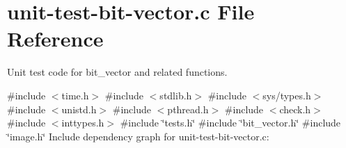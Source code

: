 \hypertarget{unit-test-bit-vector_8c}{}\section{unit-\/test-\/bit-\/vector.c File Reference}
\label{unit-test-bit-vector_8c}


Unit test code for bit\+\_\+vector and related functions.  


{\ttfamily \#include $<$time.\+h$>$}\newline
{\ttfamily \#include $<$stdlib.\+h$>$}\newline
{\ttfamily \#include $<$sys/types.\+h$>$}\newline
{\ttfamily \#include $<$unistd.\+h$>$}\newline
{\ttfamily \#include $<$pthread.\+h$>$}\newline
{\ttfamily \#include $<$check.\+h$>$}\newline
{\ttfamily \#include $<$inttypes.\+h$>$}\newline
{\ttfamily \#include \char`\"{}tests.\+h\char`\"{}}\newline
{\ttfamily \#include \char`\"{}bit\+\_\+vector.\+h\char`\"{}}\newline
{\ttfamily \#include \char`\"{}image.\+h\char`\"{}}\newline
Include dependency graph for unit-\/test-\/bit-\/vector.c\+:
